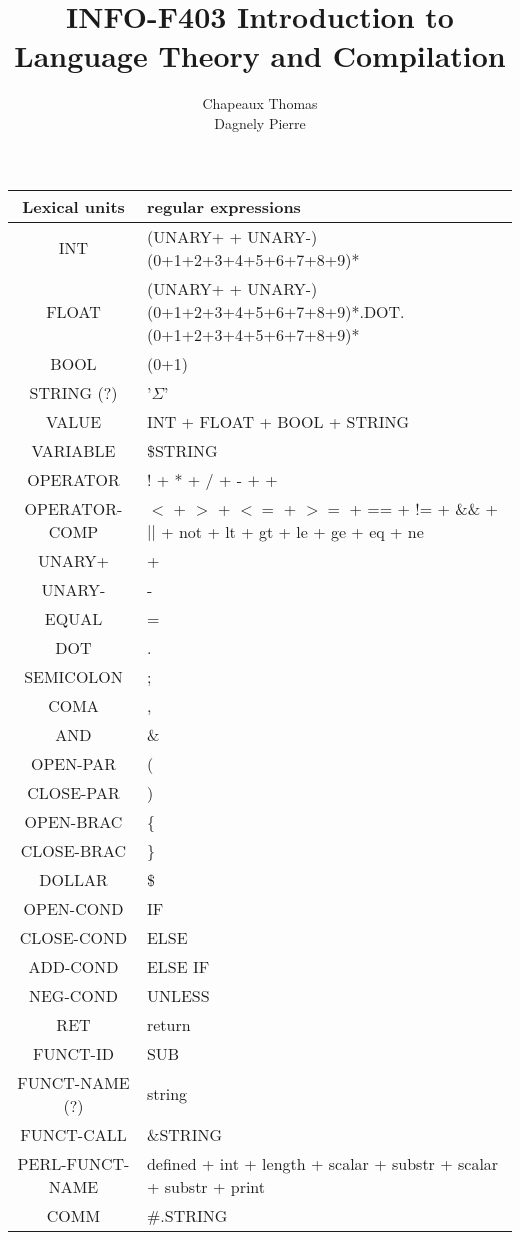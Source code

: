 \documentclass[a4paper,10pt]{article}
\title{INFO-F403 Introduction to Language Theory and Compilation}
\author{Chapeaux Thomas\\Dagnely Pierre}
\begin{document}
\maketitle


\pagebreak

\hspace{-2.5cm}\begin{tabular}{|c|l|}
\hline
Lexical units  		& regular expressions \\ \hline
INT					& (UNARY+ + UNARY-)(0+1+2+3+4+5+6+7+8+9)* \\ \hline
FLOAT				& (UNARY+ + UNARY-)(0+1+2+3+4+5+6+7+8+9)*.DOT.(0+1+2+3+4+5+6+7+8+9)* \\ \hline
BOOL				& (0+1) \\ \hline
STRING (?)			& '$\Sigma$'  \\ \hline
VALUE				& INT + FLOAT + BOOL + STRING \\ \hline
VARIABLE			& \$STRING \\ \hline
OPERATOR			& ! + * + / + - $+$ + \\ \hline
OPERATOR-COMP		& $<$ + $>$ + $<=$ + $>=$ + == + != + \&\& + $||$ + not + lt + gt + le + ge + eq + ne \\ \hline
UNARY+				& + \\ \hline
UNARY-				& - \\ \hline
EQUAL				& = \\ \hline
DOT					& . \\ \hline
SEMICOLON			& ; \\ \hline
COMA				& , \\ \hline
AND					& \& \\ \hline
OPEN-PAR			& ( \\ \hline
CLOSE-PAR			& ) \\ \hline
OPEN-BRAC			& \{ \\ \hline
CLOSE-BRAC			& \} \\ \hline
DOLLAR				& \$ \\ \hline
OPEN-COND			& IF \\ \hline
CLOSE-COND 			& ELSE \\ \hline
ADD-COND			& ELSE IF \\ \hline
NEG-COND			& UNLESS \\ \hline
RET					& return \\ \hline
FUNCT-ID			& SUB \\ \hline
FUNCT-NAME (?)		& string \\ \hline 
FUNCT-CALL			& \&STRING \\ \hline
PERL-FUNCT-NAME		& defined + int + length + scalar + substr + scalar + substr + print\\ \hline
COMM				& \#.STRING \\ \hline


\end{tabular}
\end{document}
